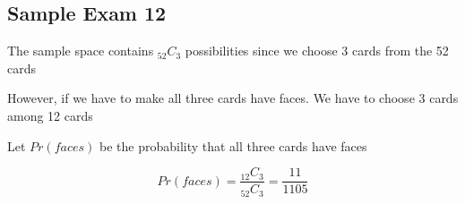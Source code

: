 \documentclass[12pt]{article}
\begin{document}
\begin{spacing}{2.0}
\section*{Sample Exam 12}
The sample space contains ${}_{52}C_{3}$ possibilities since we choose 3 cards from the 52 cards

However, if we have to make all three cards have faces. We have to choose 3 cards among 12 cards

Let $Pr(faces)$ be the probability that all three cards have faces

$$Pr(faces)= \frac{{}_{12}C_{3}}{{}_{52}C_{3}} = \frac{11}{1105}$$

\end{spacing}
\end{document}
